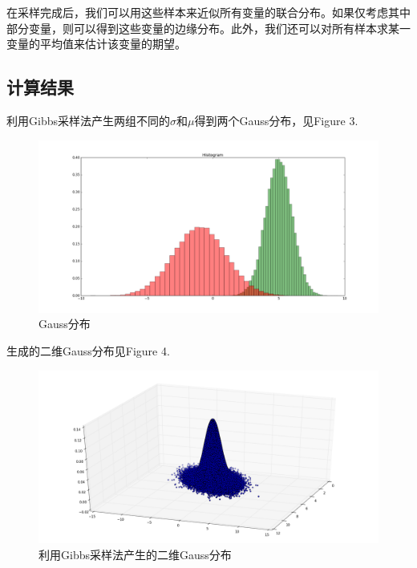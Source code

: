 \documentclass[twoside,twocolumn]{article}
\begin{document}
\begin{CJK*}{UTF8}{gkai}
	在采样完成后，我们可以用这些样本来近似所有变量的联合分布。如果仅考虑其中部分变量，则可以得到这些变量的边缘分布。此外，我们还可以对所有样本求某一变量的平均值来估计该变量的期望。
	\subsection{计算结果}
	利用Gibbs采样法产生两组不同的$\sigma$和$\mu$得到两个Gauss分布，见Figure 3.
	\begin{figure}[h]
	\centering
	\includegraphics[width=1.0\linewidth]{figure/gibbs1}
	\caption{Gauss分布}
	\label{fig:gibbs1}
	\end{figure}
	生成的二维Gauss分布见Figure 4.
	\onecolumn
	\begin{figure}[h]
	\centering
	\includegraphics[width=1.0\linewidth]{figure/gibbs2}
	\caption{利用Gibbs采样法产生的二维Gauss分布}
	\label{fig:gibbs2}
	\end{figure}


\newpage
\onecolumn
\begin{appendices}

\end{appendices}
\end{CJK*}
\end{document}
